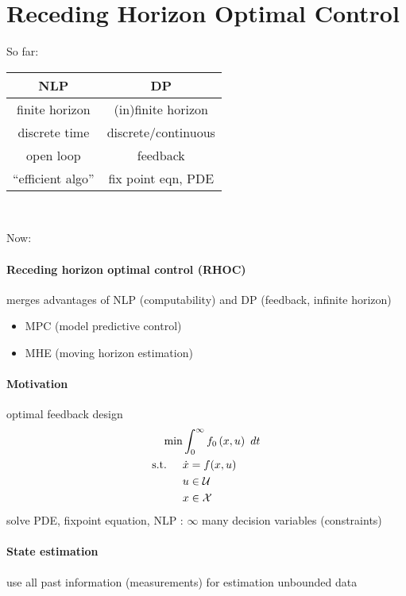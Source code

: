 \section{Receding Horizon Optimal Control}

So far:
\begin{center}
    \begin{tabu} to \columnwidth{cc}
        \toprule
        \textbf{NLP}         & \textbf{DP}  \\
        \midrule
        finite horizon        & (in)finite horizon\\
        discrete time        & discrete/continuous\\
        open loop            & feedback\\
        ``efficient algo''  & fix point eqn, PDE\\
        \bottomrule
    \end{tabu}
\end{center}~

Now:\\
\paragraph{Receding horizon optimal control (RHOC)}
merges advantages of NLP (computability) and DP (feedback, infinite horizon)
\begin{itemize}
    \item MPC (model predictive control)
    \item MHE (moving horizon estimation)
\end{itemize}
\paragraph{Motivation} optimal feedback design
\begin{align*}
    \min &\intdt{0}{\infty}{f_0 \paren{x,u}}\\
    \txt{s.t. } \quad & \dot{x} = f(x,u)\\
                    & u \in \setU{}\\
                    & x \in \setX{}
\end{align*}
solve PDE, fixpoint equation, NLP :\lat{} $\infty$ many decision variables (constraints)

\paragraph{State estimation}
use all past information (measurements) for estimation \lat{} unbounded data





\cleardoublepage
